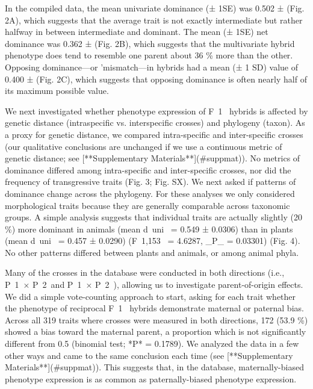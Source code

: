 \documentclass[times, twoside, watermark]{zHenriquesLab-StyleBioRxiv}
\begin{document}
In the compiled data, the mean univariate dominance (± 1SE) was 0.502 ±  (Fig. 2A), which suggests that the average trait is not exactly intermediate but rather halfway in between intermediate and dominant. The mean (± 1SE) net dominance was 0.362 ±  (Fig. 2B), which suggests that the multivariate hybrid phenotype does tend to resemble one parent about 36 \% more than the other. Opposing dominance---or 'mismatch---in hybrids had a mean (± 1 SD) value of 0.400 ±  (Fig. 2C), which suggests that opposing dominance is often nearly half of its maximum possible value. \par

We next investigated whether phenotype expression of F~1~ hybrids is affected by genetic distance (intraspecific vs. interspecific crosses) and phylogeny (taxon). As a proxy for genetic distance, we compared intra-specific and inter-specific crosses (our qualitative conclusions are unchanged if we use a continuous metric of genetic distance; see [**Supplementary Materials**](#suppmat)). No metrics of dominance differed among intra-specific and inter-specific crosses, nor did the frequency of transgressive traits (Fig. 3; Fig. SX). We next asked if patterns of dominance change across the phylogeny. For these analyses we only considered morphological traits because they are generally comparable across taxonomic groups. A simple analysis suggests that individual traits are actually slightly (20 \%) more dominant in animals (mean d~uni~ = 0.549 ± 0.0306) than in plants (mean d~uni~ = 0.457 ± 0.0290) (F~1,153~ = 4.6287, _P_ = 0.03301) (Fig. 4). No other patterns differed between plants and animals, or among animal phyla. \par

Many of the crosses in the database were conducted in both directions (i.e., P~1~\Female × P~2~\Male and P~1~\Male × P~2~\Female), allowing us to investigate parent-of-origin effects. We did a simple vote-counting approach to start, asking for each trait whether the phenotype of reciprocal F~1~ hybrids demonstrate maternal or paternal bias. Across all 319 traits where crosses were measured in both directions, 172 (53.9 \%) showed a bias toward the maternal parent, a proportion which is not significantly different from 0.5 (binomial test; *P* = 0.1789). We analyzed the data in a few other ways and came to the same conclusion each time (see [**Supplementary Materials**](#suppmat)). This suggests that, in the database, maternally-biased phenotype expression is as common as paternally-biased phenotype expression.
\end{document}

